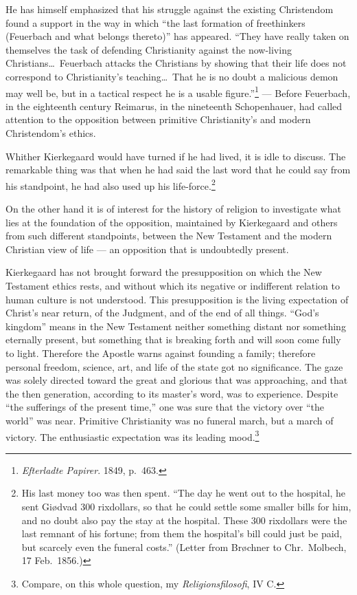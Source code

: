 \documentclass[12pt,a4paper]{book}
\newcommand{\opage}[1]{\marginnote{\footnotesize\textit{[#1]}}}
\begin{document}
He has himself emphasized that his struggle against the existing Christendom found a support in the
way in which ``the last formation of freethinkers (Feuerbach and what belongs thereto)'' has
appeared. ``They have really taken on themselves the task of defending Christianity against the
now-living Christians\ldots\ Feuerbach attacks the Christians by showing that their life does not
correspond to Christianity's teaching\ldots\ That he is no doubt a malicious demon may well be, but
in a tactical respect he is a usable figure.''\footnote{\emph{Efterladte Papirer}. 1849, p.~463.}
--- Before Feuerbach, in the eighteenth century Reimarus, in the nineteenth Schopenhauer, had
called attention to the opposition between primitive Christianity's and modern Christendom's ethics.

Whither Kierkegaard would have turned if he had lived, it is idle to discuss. The remarkable thing
was that when he had said the last word that he could say from his standpoint, he had also used up
his life-force.\footnote{His last money too was then spent. ``The day he went out to the hospital,
he sent Giødvad 300 rixdollars, so that he could settle some smaller bills for him, and no doubt
also pay the stay at the hospital. These 300 rixdollars were the last remnant of his fortune; from
them the hospital's bill could just be paid, but scarcely even the funeral costs.'' (Letter from
Brøchner to Chr.\ Molbech, 17 Feb.\ 1856.)}

On the other hand it is of interest for the history of religion to investigate what lies at the
foundation of the opposition, maintained by Kierkegaard and others from such different standpoints,
\opage{172}between the New Testament and the modern Christian view of life --- an opposition that is
undoubtedly present.

Kierkegaard has not brought forward the presupposition on which the New Testament ethics rests, and
without which its negative or indifferent relation to human culture is not understood. This
presupposition is the living expectation of Christ's near return, of the Judgment, and of the end
of all things. ``God's kingdom'' means in the New Testament neither something distant nor something
eternally present, but something that is breaking forth and will soon come fully to light.
Therefore the Apostle warns against founding a family; therefore personal freedom, science, art,
and life of the state got no significance. The gaze was solely directed toward the great and
glorious that was approaching, and that the then generation, according to its master's word, was to
experience. Despite ``the sufferings of the present time,'' one was sure that the victory over
``the world'' was near. Primitive Christianity was no funeral march, but a march of victory. The
enthusiastic expectation was its leading mood.\footnote{Compare, on this whole question, my
\emph{Religionsfilosofi}, IV C.}
\end{document}
